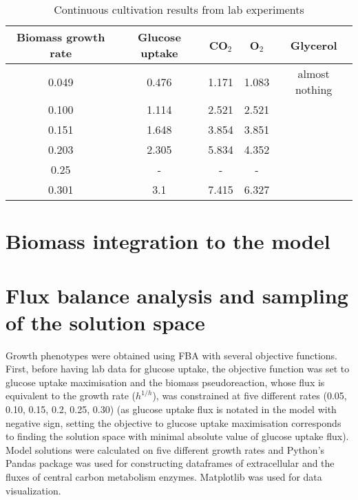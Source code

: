 \begin{table}[h]
    \centering
    \caption{Continuous cultivation results from lab experiments}
    \begin{tabular}{c|c|c|c|c}
        
            \textbf{Biomass growth rate} & \textbf{Glucose uptake} & \textbf{CO$_2$} & \textbf{O$_2$} & \textbf{Glycerol} \\ \hline
            0.049 & 0.476 & 1.171 & 1.083 & almost nothing \\ 
            0.100 & 1.114 & 2.521 & 2.521 & ~ \\ 
            0.151 & 1.648 & 3.854 & 3.851 & ~ \\ 
            0.203 & 2.305 & 5.834 & 4.352 & ~ \\ 
            0.25 & - & - & - & ~  \\ 
            0.301 & 3.1 & 7.415 & 6.327 & ~ \\ 
        \end{tabular}
    \label{table:LabData}
\end{table}


\section{Biomass integration to the model}




\section{Flux balance analysis and sampling of the solution space} 


Growth phenotypes were obtained using FBA with several objective functions. First, before having lab data for glucose uptake, 
the objective function was set to glucose uptake maximisation and the biomass pseudoreaction, whose flux is equivalent to the growth 
rate ($h^{1/h}$), was constrained at five different rates (0.05, 0.10, 0.15, 0.2, 0.25, 0.30) (as glucose uptake flux is notated in the model 
with negative sign, setting the objective to glucose uptake maximisation corresponds to finding the solution space with minimal 
absolute value of glucose uptake flux). %
Model solutions were calculated on five different growth rates and Python's Pandas package was used for constructing 
dataframes of extracellular and the fluxes of central carbon metabolism enzymes. Matplotlib was used for data visualization.

